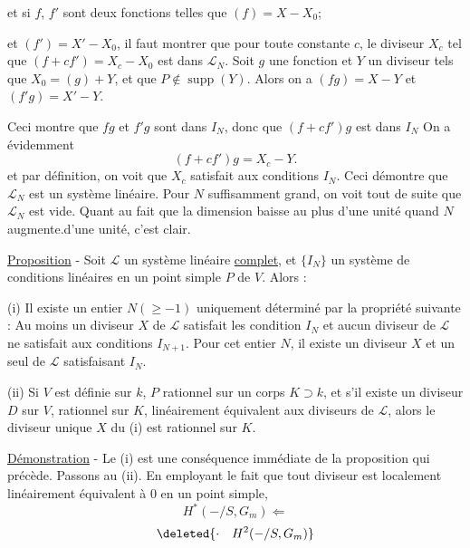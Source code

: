 et si $f$, $f'$ sont deux fonctions telles que $(f)=X-X_0$;

et $(f')=X'-X_0$, il faut montrer que pour toute constante $c$, le diviseur $X_c$ tel que $(f+cf')=X_c-X_0$ est dans $\mathcal L_N$. Soit $g$ une fonction et $Y$ un diviseur tels que $X_0=(g)+Y$, et que $P\notin\operatorname{supp}(Y)$. Alors on a $(fg)=X-Y$ et $(f'g)=X'-Y$.

Ceci montre que $fg$ et $f'g$ sont dans $I_N$, donc que $(f+cf')g$ est dans $I_N$ On a évidemment
\[
(f+cf')g=X_c-Y.
\]
et par définition, on voit que $X_c$ satisfait aux conditions $I_N$. Ceci démontre que $\mathcal L_N$ est un système linéaire. Pour $N$ suffisamment grand, on voit tout de suite que $\mathcal L_N$ est vide. Quant au fait que la dimension baisse au plus d'une unité quand $N$ augmente.d'une unité, c'est clair.

\uline{Proposition} - Soit $\mathcal L$ un système linéaire \uline{complet}, et $\{I_N\}$ un système de conditions linéaires en un point simple $P$ de $V$. Alors :

(i) Il existe un entier $N(\geq-1)$ uniquement déterminé par la propriété suivante : Au moins un diviseur $X$ de $\mathcal L$ satisfait les condition $I_N$ et aucun diviseur de $\mathcal L$ ne satisfait aux conditions $I_{N+1}$. Pour cet entier $N$, il existe un diviseur $X$ et un seul de $\mathcal L$ satisfaisant $I_N$.

(ii) Si $V$ est définie sur $k$, $P$ rationnel sur un corps $K\supset k$, et s'il existe un diviseur $D$ sur $V$, rationnel sur $K$, linéairement équivalent aux diviseurs de $\mathcal L$, alors le diviseur unique $X$ du (i) est rationnel sur $K$.

\uline{Démonstration} - Le (i) est une conséquence immédiate de la proposition qui précède. Passons au (ii). En employant le fait que tout diviseur est localement linéairement équivalent à $0$ en un point simple,
\[H^*(-/S,G_m)\Longleftarrow\]
\[\deleted{\cdot\quad H^2(-/S,G_m)}\]

